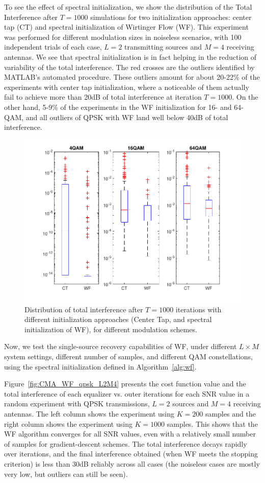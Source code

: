 To see the effect of spectral initialization, we show the distribution of the Total Interference after $T=1000$ simulations for two initialization approaches: center tap (CT) and spectral initialization of Wirtinger Flow (WF). This experiment was performed for different modulation sizes in noiseless scenarios, with 100 independent trials of each case, $L=2$ transmitting sources and $M=4$ receiving antennas. We see that spectral initialization is in fact helping in the reduction of variability of the total interference. The red crosses are the outliers identified by MATLAB's automated procedure. These outliers amount for about 20-22\% of the experiments with center tap initialization, where a noticeable of them actually fail to achieve more than 20dB of total interference at iteration $T=1000$. On the other hand, 5-9\% of the experiments in the WF initialization for 16- and 64-QAM, and all outliers of QPSK with WF land well below 40dB of total interference.
\begin{figure}
	\centering
	\includegraphics[width=0.8\linewidth]{./figs/WF_noiseless_mu1e3_M4L2_distr.pdf}
	\caption{Distribution of total interference after $T=1000$ iterations with different initialization approaches (Center Tap, and spectral initialization of WF), for different modulation schemes. }
	\label{fig:CMA_WF_ti_distribution}
\end{figure}


Now, we test the single-source recovery capabilities of WF, under different $L\times M$ system settings, different number of samples, and different QAM constellations, using the spectral initialization defined in Algorithm~\ref{alg:wf}. 

Figure~\ref{fig:CMA_WF_qpsk_L2M4} presents the cost function value and the total interference of each equalizer vs. outer iterations for each SNR value in a random experiment with QPSK transmissions, $L=2$ sources and $M=4$ receiving antennas. The left column shows the experiment using $K=200$ samples and the right column shows the experiment using $K=1000$ samples. This shows that the WF algorithm converges for all SNR values, even with a relatively small number of samples for gradient-descent schemes. The total interference decays rapidly over iterations, and the final interference obtained (when WF meets the stopping criterion) is less than 30dB reliably across all cases (the noiseless cases are mostly very low, but outliers can still be seen).

